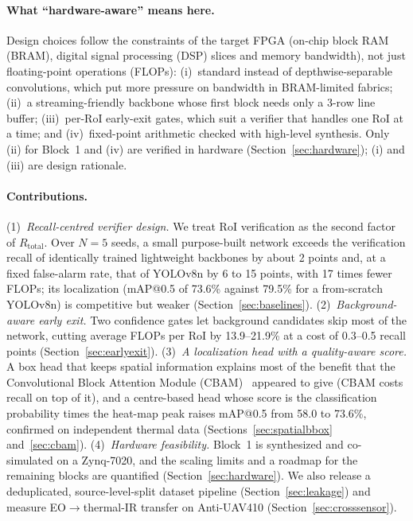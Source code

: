 \documentclass[pdflatex,sn-mathphys-num,iicol]{sn-jnl}%
\begin{document}
\paragraph{What ``hardware-aware'' means here.} Design choices follow the
constraints of the target FPGA (on-chip block RAM (BRAM), digital signal
processing (DSP) slices and memory bandwidth), not just floating-point
operations (FLOPs): (i)~standard instead of depthwise-separable convolutions,
which put more pressure on bandwidth in BRAM-limited fabrics; (ii)~a
streaming-friendly backbone whose first block needs only a 3-row line buffer;
(iii)~per-RoI early-exit gates, which suit a verifier that handles one RoI at
a time; and (iv)~fixed-point arithmetic checked with high-level synthesis.
Only (ii) for Block~1 and (iv) are verified in hardware
(Section~\ref{sec:hardware}); (i) and (iii) are design rationale.

\paragraph{Contributions.} (1)~\emph{Recall-centred verifier design.} We treat RoI verification as the
second factor of $R_{\text{total}}$. Over $N{=}5$ seeds, a small purpose-built
network exceeds the verification recall of identically trained lightweight
backbones by about 2 points and, at a fixed false-alarm rate, that of YOLOv8n
by 6 to 15 points, with 17 times fewer FLOPs; its localization (mAP@0.5 of
73.6\% against 79.5\% for a from-scratch YOLOv8n) is competitive but weaker
(Section~\ref{sec:baselines}).
(2)~\emph{Background-aware early exit.} Two confidence gates let
background candidates skip most of the network, cutting average FLOPs per
RoI by 13.9--21.9\% at a cost of 0.3--0.5 recall points
(Section~\ref{sec:earlyexit}). (3)~\emph{A localization head with a quality-aware score.} A box head that
keeps spatial information explains most of the benefit that the Convolutional
Block Attention Module (CBAM)~\cite{woo2018cbam} appeared to give (CBAM costs
recall on top of it), and a centre-based head whose score is the classification
probability times the heat-map peak raises mAP@0.5 from 58.0 to 73.6\%,
confirmed on independent thermal data (Sections~\ref{sec:spatialbbox} and~\ref{sec:cbam}).
(4)~\emph{Hardware feasibility.} Block~1 is synthesized and co-simulated on a
Zynq-7020, and the scaling limits and a roadmap for the remaining blocks are
quantified (Section~\ref{sec:hardware}). We also release a deduplicated,
source-level-split dataset pipeline (Section~\ref{sec:leakage}) and measure
EO$\to$thermal-IR transfer on Anti-UAV410 (Section~\ref{sec:crosssensor}).
\end{document}
